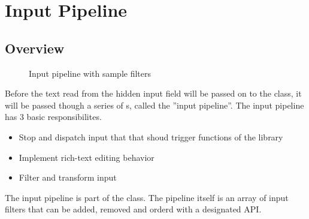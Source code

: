 
\section{Input Pipeline}
\label{sec:input_pipeline}

\subsection{Overview} 
\label{subsec:input_pipeline_overview}

\begin{figure}[!htb]
\centering
{}
\caption{Input pipeline with sample filters}
\label{fig:type_base_components}
\end{figure}

Before the text read from the hidden input field will be passed on to the  class, it will be passed though a series of s, called the ''input pipeline''. The input pipeline has 3 basic responsibilites.

\begin{itemize}
\item Stop and dispatch input that that shoud trigger functions of the library
\item Implement rich-text editing behavior
\item Filter and transform input
\end{itemize}

The input pipeline is part of the  class. The pipeline itself is an array of input filters that can be added, removed and orderd with a designated API.

